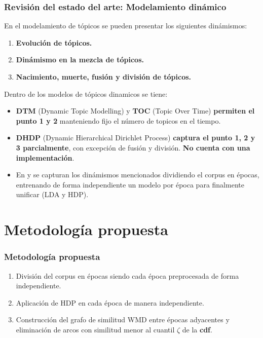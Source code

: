 \documentclass[
	spanish, %
	aspectratio=43, %
	hyperref={pdfencoding=auto,psdextra},
	xcolor={dvipsnames,table,usenames},
]{beamer}
\begin{document}
\begin{frame}[t]
\frametitle{Revisión del estado del arte: Modelamiento dinámico}
En el modelamiento de tópicos se pueden presentar los siguientes dinámismos:

\begin{enumerate}
  \item \textbf{Evolución de tópicos.}
  \item \textbf{Dinámismo en la mezcla de tópicos.}
  \item \textbf{Nacimiento, muerte, fusión y división de tópicos.}
\end{enumerate}

Dentro de los modelos de tópicos dinamicos se tiene:
\begin{itemize}
  \item \textbf{DTM} (Dynamic Topic Modelling)\cite{blei2006dynamic} y \textbf{TOC} (Topic Over Time)\cite{wang2006topics} \textbf{permiten el punto 1 y 2} manteniendo fijo el número de topicos en el tiempo.
  \item \textbf{DHDP} (Dynamic Hierarchical Dirichlet Process)\cite{ahmed2012timeline} \textbf{captura el punto 1, 2 y 3 parcialmente}, con excepción de fusión y división. \textbf{No cuenta con una implementación}.\\
  \item En \cite{wilson2011tracking} y \cite{beykikhoshk2018discovering} se capturan los dinámismos mencionados dividiendo el corpus en épocas, entrenando de forma independiente un modelo por época para finalmente unificar (LDA y HDP).
\end{itemize}
\end{frame}


\section{Metodología propuesta}
\begin{frame}[t]
\frametitle{Metodología propuesta}
\begin{enumerate}
  \item División del corpus en épocas siendo cada época preprocesada de forma independiente. 
  \item Aplicación de HDP en cada época de manera independiente. 
  \item Construcción del grafo de similitud WMD entre épocas adyacentes y eliminación de arcos con similitud menor al cuantil $\zeta$ de la \textbf{cdf}.
\end{enumerate}

\vspace*{-0.1in}

\end{frame}
\end{document}
